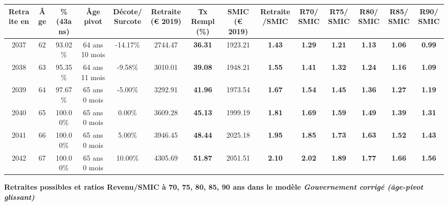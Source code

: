 \begin{adjustbox}{max width=\textwidth} 
\begin{tabular}[htb]{|c|c||c|c|c||c|c||c|c||c|c|c|c|c|} 
\hline 
 Retraite en &  Âge &  \%(43ans) &  Âge pivot &  Décote/Surcote &  Retraite (\euro{} 2019) &  Tx Rempl(\%) &  SMIC (\euro{} 2019) &  Retraite/SMIC &  R70/SMIC &  R75/SMIC &  R80/SMIC &  R85/SMIC &  R90/SMIC \\ 
\hline \hline 
 2037 &  62 &  93.02\% &  64 ans 10 mois &  -14.17\% &  2744.47 &  {\bf 36.31} &  1923.21 &  {\bf 1.43} &  {\bf 1.29} &  {\bf 1.21} &  {\bf 1.13} &  {\bf 1.06} &  {\bf {\color{red} 0.99}} \\ 
\hline 
 2038 &  63 &  95.35\% &  64 ans 11 mois &  -9.58\% &  3010.01 &  {\bf 39.08} &  1948.21 &  {\bf 1.55} &  {\bf 1.41} &  {\bf 1.32} &  {\bf 1.24} &  {\bf 1.16} &  {\bf 1.09} \\ 
\hline 
 2039 &  64 &  97.67\% &  65 ans 0 mois &  -5.00\% &  3292.91 &  {\bf 41.96} &  1973.54 &  {\bf 1.67} &  {\bf 1.54} &  {\bf 1.45} &  {\bf 1.36} &  {\bf 1.27} &  {\bf 1.19} \\ 
\hline 
 2040 &  65 &  100.00\% &  65 ans 0 mois &  0.00\% &  3609.28 &  {\bf 45.13} &  1999.19 &  {\bf 1.81} &  {\bf 1.69} &  {\bf 1.59} &  {\bf 1.49} &  {\bf 1.39} &  {\bf 1.31} \\ 
\hline 
 2041 &  66 &  100.00\% &  65 ans 0 mois &  5.00\% &  3946.45 &  {\bf 48.44} &  2025.18 &  {\bf 1.95} &  {\bf 1.85} &  {\bf 1.73} &  {\bf 1.63} &  {\bf 1.52} &  {\bf 1.43} \\ 
\hline 
 2042 &  67 &  100.00\% &  65 ans 0 mois &  10.00\% &  4305.69 &  {\bf 51.87} &  2051.51 &  {\bf 2.10} &  {\bf 2.02} &  {\bf 1.89} &  {\bf 1.77} &  {\bf 1.66} &  {\bf 1.56} \\ 
\hline 
\hline 
\end{tabular} 
\end{adjustbox} 
 
 \vspace{0.1cm} 
{\bf \noindent Retraites possibles et ratios Revenu/SMIC à 70, 75, 80, 85, 90 ans dans le modèle \emph{Gouvernement corrigé (âge-pivot glissant)}}  
 

